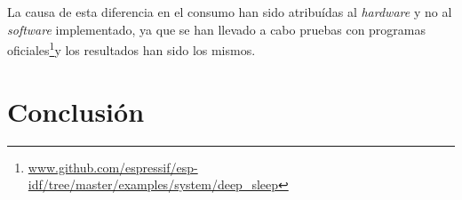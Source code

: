 \documentclass{article}
\newcommand{ \fnejemplos }{\footnote{\url{www.github.com/espressif/esp-idf/tree/master/examples/system/deep_sleep}}}
\begin{document}
    La causa de esta diferencia en el consumo han sido atribuídas al 
    \emph{hardware} y no al \emph{software} implementado, ya que se han llevado
    a cabo pruebas con programas oficiales\fnejemplos y los resultados han sido
    los mismos.


    \newpage
    \section{Conclusión}

\end{document}
